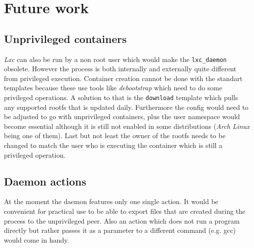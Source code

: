 \chapter{Future work}

\section{Unprivileged containers}

\textit{Lxc} can also be run by a non root user which would make the \texttt{lxc\_daemon} obsolete.
However the process is both internally and externally quite different from privileged execution.
Container creation cannot be done with the standart templates because these use tools like
\textit{debootstrap} which need to do some privileged operations. A solution to that is the \texttt{download} template
which pulls any supported rootfs that is updated daily. Furthermore the config would need to
be adjusted to go with unprivileged containers, plus the user namespace would become essential
although it is still not enabled in some distributions (\textit{Arch Linux} being one of them).
Last but not least the owner of the rootfs needs to be changed to match the user who is executing
the container which is still a privileged operation.

\section{Daemon actions}

At the moment the daemon features only one single action. It would be convenient for practical use
to be able to export files that are created during the process to the unprivileged peer.
Also an action which does not run a program directly but rather passes it as a parameter to a different
command (e.g. gcc) would come in handy.